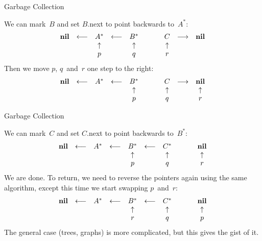 \documentclass[compress,dvipdfmx]{beamer}
\begin{document}
%
\begin{frame}{Garbage Collection}

  We can mark~\(B\) and set \(B\).next to point backwards to~\(A^*\):
  \[
  \begin{array}{ccccccccc}
    \textbf{nil} & \longleftarrow & A^* & \longleftarrow & B^*
    & \hphantom{\longrightarrow} & C & \longrightarrow & \textbf{nil} \\
    && \uparrow && \uparrow && \uparrow \\
    && p        && q        && r
  \end{array}
  \]
  Then we move \(p\), \(q\)~and~\(r\) one step to the right:
  \[
  \begin{array}{ccccccccc}
    \textbf{nil} & \longleftarrow & A^* & \longleftarrow & B^*
    & \hphantom{\longrightarrow} & C & \longrightarrow & \textbf{nil} \\
    &&&& \uparrow && \uparrow && \uparrow \\
    &&&& p        && q        && r
  \end{array}
  \]

\end{frame}

%
\begin{frame}{Garbage Collection}

  We can mark~\(C\) and set \(C\).next to point backwards to~\(B^*\):
  \[
  \begin{array}{ccccccccc}
    \textbf{nil} & \longleftarrow & A^* & \longleftarrow & B^*
    & \longleftarrow & C^* & \hphantom{\longrightarrow} & \textbf{nil} \\
    &&&& \uparrow && \uparrow && \uparrow \\
    &&&& p        && q        && r
  \end{array}
  \]
  We are done. To return, we need to reverse the pointers again using
  the same algorithm, except this time we start swapping
  \(p\)~and~\(r\):
  \[
  \begin{array}{ccccccccc}
    \textbf{nil} & \longleftarrow & A^* & \longleftarrow & B^*
    & \longleftarrow & C^* & \hphantom{\longrightarrow} & \textbf{nil} \\
    &&&& \uparrow && \uparrow && \uparrow \\
    &&&& r        && q        && p
  \end{array}
  \]
  The general case (trees, graphs) is more complicated, but this gives
  the gist of it.

\end{frame}
\end{document}

